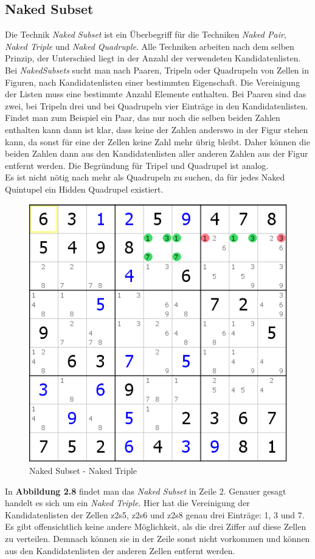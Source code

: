 \newpage
\subsection{Naked Subset}
Die Technik \textit{Naked Subset} ist ein Überbegriff für die Techniken \textit{Naked Pair}, \textit{Naked Triple} und \textit{Naked Quadruple}. Alle Techniken arbeiten nach dem selben Prinzip, der Unterschied liegt in der Anzahl der verwendeten Kandidatenlisten. Bei \textit{NakedSubsets} sucht man nach Paaren, Tripeln oder Quadrupeln von Zellen in Figuren, nach Kandidatenlisten einer bestimmten Eigenschaft. Die Vereinigung der Listen muss eine bestimmte Anzahl Elemente enthalten. Bei Paaren sind das zwei, bei Tripeln drei und bei Quadrupeln vier Einträge in den Kandidatenlisten.\\
Findet man zum Beispiel ein Paar, das nur noch die selben beiden Zahlen enthalten kann dann ist klar, dass keine der Zahlen anderswo in der Figur stehen kann, da sonst für eine der Zellen keine Zahl mehr übrig bleibt. Daher können die beiden Zahlen dann aus den Kandidatenlisten aller anderen Zahlen aus der Figur entfernt werden.
Die Begründung für Tripel und Quadrupel ist analog.\\
Es ist nicht nötig nach mehr als Quadrupeln zu suchen, da für jedes Naked Quintupel ein Hidden Quadrupel existiert.

\begin{figure}[h]
\begin{center}
\includegraphics{./img/naked_subset.png}
\caption{Naked Subset - Naked Triple}
\end{center}
\end{figure}

\noindent In \textbf{Abbildung 2.8} findet man das \textit{Naked Subset} in Zeile 2. Genauer gesagt handelt es sich um ein \textit{Naked Triple}. Hier hat die Vereinigung der Kandidatenlisten der Zellen z2s5, z2s6 und z2s8 genau drei Einträge: 1, 3 und 7. Es gibt offensichtlich keine andere Möglichkeit, als die drei Ziffer auf diese Zellen zu verteilen. Demnach können sie in der Zeile sonst nicht vorkommen und können aus den Kandidatenlisten der anderen Zellen entfernt werden.
